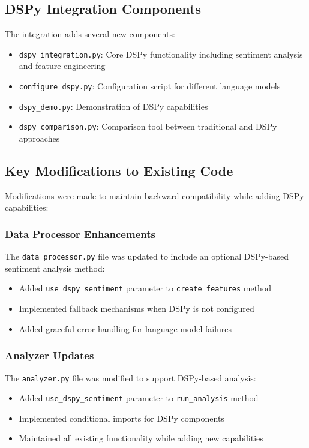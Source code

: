 \documentclass[11pt]{article}
\begin{document}
\subsection{DSPy Integration Components}

The integration adds several new components:
\begin{itemize}
    \item \texttt{dspy\_integration.py}: Core DSPy functionality including sentiment analysis and feature engineering
    \item \texttt{configure\_dspy.py}: Configuration script for different language models
    \item \texttt{dspy\_demo.py}: Demonstration of DSPy capabilities
    \item \texttt{dspy\_comparison.py}: Comparison tool between traditional and DSPy approaches
\end{itemize}

\subsection{Key Modifications to Existing Code}

Modifications were made to maintain backward compatibility while adding DSPy capabilities:

\subsubsection{Data Processor Enhancements}
The \texttt{data\_processor.py} file was updated to include an optional DSPy-based sentiment analysis method:
\begin{itemize}
    \item Added \texttt{use\_dspy\_sentiment} parameter to \texttt{create\_features} method
    \item Implemented fallback mechanisms when DSPy is not configured
    \item Added graceful error handling for language model failures
\end{itemize}

\subsubsection{Analyzer Updates}
The \texttt{analyzer.py} file was modified to support DSPy-based analysis:
\begin{itemize}
    \item Added \texttt{use\_dspy\_sentiment} parameter to \texttt{run\_analysis} method
    \item Implemented conditional imports for DSPy components
    \item Maintained all existing functionality while adding new capabilities
\end{itemize}
\end{document}
